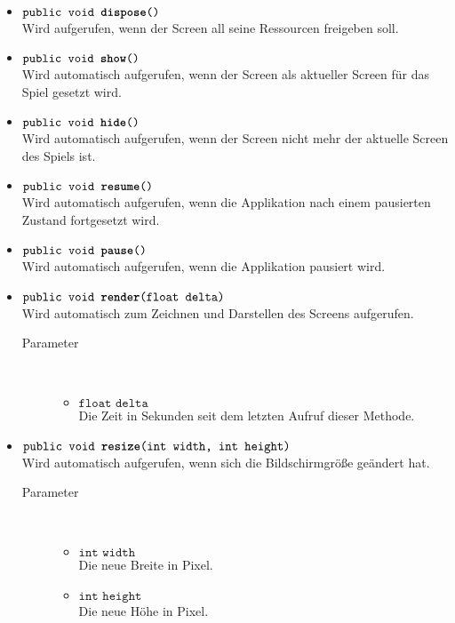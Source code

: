 \begin{description}
\begin{itemize}
		\item $\texttt{public void \textbf{dispose}()}$ \\ Wird aufgerufen, wenn der Screen all seine Ressourcen freigeben soll.
		
		\item $\texttt{public void \textbf{show}()}$ \\ Wird automatisch aufgerufen, wenn der Screen als aktueller Screen für das Spiel gesetzt wird.
	
		\item $\texttt{public void \textbf{hide}()}$ \\ Wird automatisch aufgerufen, wenn der Screen nicht mehr der aktuelle Screen des Spiels ist.
	
		\item $\texttt{public void \textbf{resume}()}$ \\ Wird automatisch aufgerufen, wenn die Applikation nach einem pausierten Zustand fortgesetzt wird.	
	
		\item $\texttt{public void \textbf{pause}()}$ \\ Wird automatisch aufgerufen, wenn die Applikation pausiert wird.
	
		\item $\texttt{public void \textbf{render}(float delta)}$ \\ Wird automatisch zum Zeichnen und Darstellen des Screens aufgerufen.
		\begin{description}
			\item[Parameter] \hfill \\
			\vspace{-.8cm}
			\begin{itemize}
				\item $\texttt{float delta}$ \\ Die Zeit in Sekunden seit dem letzten Aufruf dieser Methode.
			\end{itemize}
		\end{description}	
	
		\item $\texttt{public void \textbf{resize}(int width, int height)}$ \\ Wird automatisch aufgerufen, wenn sich die Bildschirmgröße geändert hat.
		\begin{description}
			\item[Parameter] \hfill \\
			\vspace{-.8cm}
			\begin{itemize}
				\item $\texttt{int width}$ \\ Die neue Breite in Pixel.
				\item $\texttt{int height}$ \\ Die neue Höhe in Pixel.
			\end{itemize}
		\end{description}
	\end{itemize}
\end{description}

